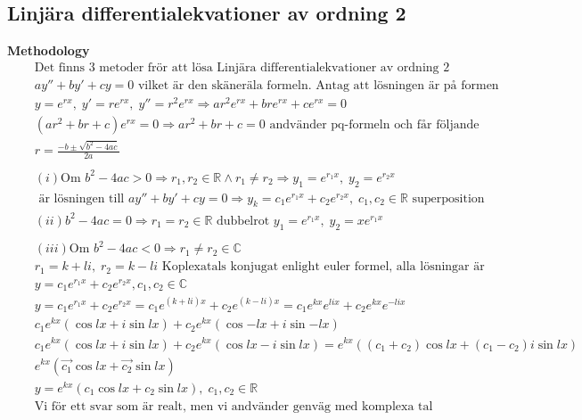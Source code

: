 \documentclass{article}
\begin{document}
\subsection{Linjära differentialekvationer av ordning 2}
\textbf{Methodology}  
\begin{align*}
  &\quad  \text{Det finns 3 metoder frör att lösa Linjära differentialekvationer av ordning 2} \\
  &\quad  ay'' + by' +cy = 0 \text{ vilket är den skäneräla formeln. Antag att lösningen är på formen} \\
  &\quad  y=e^{rx}, \; y'=re^{rx}, \; y''=r^2e^{rx} \Rightarrow ar^2e^{rx} + bre^{rx} + ce^{rx} = 0 \\
  &\quad  (ar^2+br+c)e^{rx}=0 \Rightarrow ar^2+br+c=0 \text{ andvänder pq-formeln och får följande } \\
  &\quad  r= \frac{-b\pm\sqrt{b^2-4ac}}{2a} \\
  &\quad  \\
  &\quad  (i) \text{Om } b^2-4ac > 0 \Rightarrow r_1,r_2\in\mathbb{R} \land r_1\neq r_2  \Rightarrow
  y_1=e^{r_1x}, \; y_2=e^{r_2x} \\
  &\quad  \text{ är lösningen till }  ay'' + by' +cy = 0 \Rightarrow y_k=c_1e^{r_1x} + c_2e^{r_2x},\;
  c_1,c_2\in\mathbb{R} \text{ superposition}
  &\quad  \\
  &\quad  (ii) b^2-4ac=0 \Rightarrow r_1=r_2\in\mathbb{R} \text{ dubbelrot } y_1=e^{r_1x}, \; y_2=xe^{r_1x} \\
  &\quad  \\
  &\quad  (iii) \text{Om } b^2-4ac<0 \Rightarrow r_1\neq r_2 \in\mathbb{C}  \\
  &\quad  r_1=k+li, \; r_2=k-li  \text{ Koplexatals konjugat enlight euler formel, alla lösningar är } \\
  &\quad  y=c_1e^{r_1x} + c_2e^{r_2x}, c_1,c_2 \in\mathbb{C}  \\
  &\quad  y=c_1e^{r_1x} + c_2e^{r_2x}=c_1e^{(k+li)x} + c_2e^{(k-li)x} =
  c_1e^{kx}e^{lix} + c_2e^{kx}e^{-lix} \\
  &\quad  c_1e^{kx}(\cos{lx} + i\sin{lx}) + c_2e^{kx}(\cos{-lx} + i\sin{-lx}) \\
  &\quad  c_1e^{kx}(\cos{lx} + i\sin{lx}) + c_2e^{kx}(\cos{lx} - i\sin{lx}) =
  e^{kx}((c_1+c_2)\cos{lx} + (c_1-c_2)i\sin{lx}) \\
  &\quad  e^{kx}(\vec{c_1}\cos{lx} + \vec{c_2}\sin{lx}) \\
  &\quad  y = e^{kx}(c_1\cos{lx} + c_2\sin{lx}), \; c_1,c_2\in\mathbb{R} \\
  &\quad  \text{Vi för ett svar som är realt, men vi andvänder genväg med komplexa tal}
\end{align*}
\end{document}
